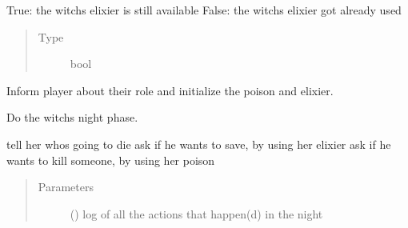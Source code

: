 \documentclass[letterpaper,10pt,english]{sphinxmanual}
\begin{document}
\begin{fulllineitems}
\begin{fulllineitems}
\begin{quote}
\begin{description}
\end{description}\end{quote}

\end{fulllineitems}



\begin{fulllineitems}
True: the witchs elixier is still available
False: the witchs elixier got already used
\begin{quote}\begin{description}
\item[{Type}] \leavevmode
bool

\end{description}\end{quote}

\end{fulllineitems}



\begin{fulllineitems}
Inform player about their role and initialize the poison and elixier.

\end{fulllineitems}



\begin{fulllineitems}
\end{fulllineitems}



\begin{fulllineitems}
Do the witchs night phase.

tell her whos going to die
ask if he wants to save, by using her elixier
ask if he wants to kill someone, by using her poison
\begin{quote}\begin{description}
\item[{Parameters}] \leavevmode
{} ({\hyperref[\detokenize{chatwolf:chatwolf.nightactions.Nightactions}]{}}) \textendash{} log of all the actions that happen(d) in the night

\end{description}\end{quote}

\end{fulllineitems}


\end{fulllineitems}
\end{document}

